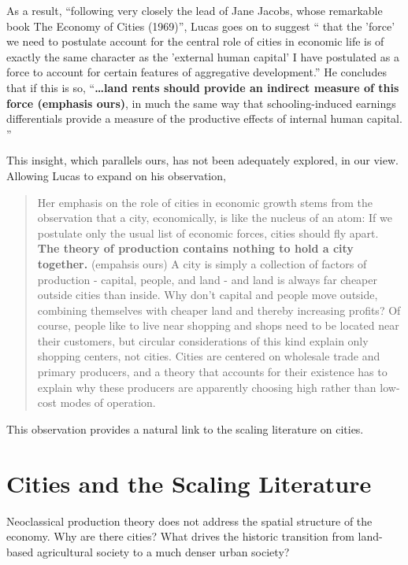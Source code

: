 As a result, ``following very closely the lead of Jane Jacobs, whose remarkable book The Economy of Cities (1969)'', Lucas goes on to suggest `` that the 'force' we need to postulate account for the central role of cities in economic life is of exactly the same character as the 'external human capital' I have postulated as a force to account for certain features of aggregative development.''  He concludes that if this is so, ``\textbf{\dots land rents should provide an indirect measure of this force (emphasis  ours)}, in much the same way that schooling-induced earnings differentials provide a measure of the productive effects of internal human capital. ''

This insight, which parallels ours, has not been adequately explored, in our view.  Allowing Lucas to expand on his observation, 


\begin{quotation}
    Her emphasis on the role of cities in economic growth stems from the observation that a city, economically, is like the nucleus of an atom: If we postulate only the usual list of economic forces, cities should fly apart. \textbf{The theory of production contains nothing to hold a city together.} (empahsis ours) A city is simply a collection of factors of production - capital, people, and land - and land is always far cheaper outside cities than inside. Why don't capital and people move outside, combining themselves with cheaper land and thereby increasing profits? Of course, people like to live near shopping and shops need to be located near their customers, but circular considerations of this kind explain only shopping centers, not cities. Cities are centered on wholesale trade and primary producers, and a theory that accounts for their existence has to explain why these producers are apparently choosing high rather than low-cost modes of operation.
\end{quotation}

This observation provides a natural link to the scaling literature on cities.


\section{Cities and the Scaling Literature}
Neoclassical production theory does not address the spatial structure of the economy. Why are there cities? What drives the historic transition from land-based agricultural society to a much denser urban society? 

